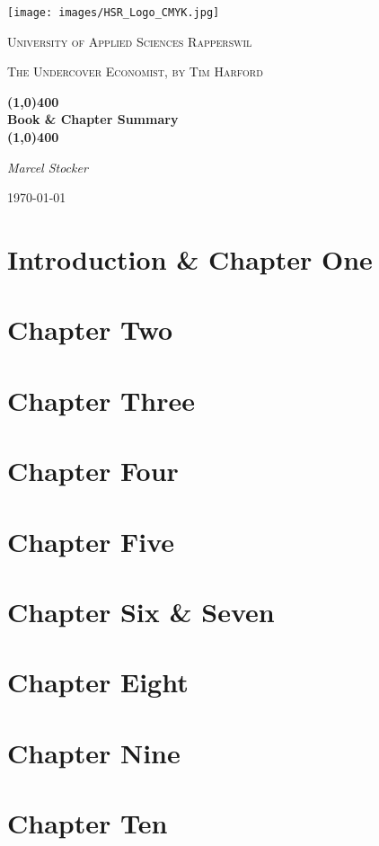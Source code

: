 \documentclass[a4paper,12pt,parskip]{scrreprt}
\newcommand{\documentauthors}{Marcel Stocker}
\newcommand{\documenttitel}{The Undercover Economist, by Tim Harford}
\newcommand{\documentsubtitel}{Book \& Chapter Summary}
\begin{document}
\author{
  Stocker, Marcel
}

\begin{titlepage}
	\centering
	\texttt{[image: images/HSR\_Logo\_CMYK.jpg]}\par\vspace{1cm}
	{\scshape\LARGE University of Applied Sciences Rapperswil \par}
	\vspace{1cm}
	{\scshape\Large \documenttitel \par}
	\vspace{0.5cm}
	{\huge\bfseries \line(1,0){400} \\ \documentsubtitel \\ \line(1,0){400} \par}
	\vspace{2cm}
	{\Large\itshape \documentauthors \par}

	\vfill

	{\large \today\par}
\end{titlepage}

\tableofcontents

\chapter{Introduction \& Chapter One}
	
\chapter{Chapter Two}
	
\chapter{Chapter Three}
	
\chapter{Chapter Four}
	
\chapter{Chapter Five}
	
\chapter{Chapter Six \& Seven}
	
\chapter{Chapter Eight}
	
\chapter{Chapter Nine}
	
\chapter{Chapter Ten}
	
\end{document}
